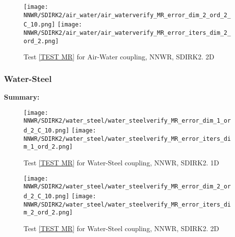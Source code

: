 \documentclass[a4paper,10pt]{article}
\begin{document}
\begin{figure}[!ht]
\texttt{[image: NNWR/SDIRK2/air\_water/air\_waterverify\_MR\_error\_dim\_2\_ord\_2\_C\_10.png]}
\texttt{[image: NNWR/SDIRK2/air\_water/air\_waterverify\_MR\_error\_iters\_dim\_2\_ord\_2.png]}
\caption{Test \ref{TEST MR} for Air-Water coupling, NNWR, SDIRK2. 2D}
\label{FIG NNWR SDIRK2 AIR WATER 2D}
\end{figure}

\FloatBarrier
\subsubsection{Water-Steel}\label{SEC NNWR SDIRK2 WATER STEEL}
% 
\textbf{Summary:}

\begin{figure}[!ht]
\texttt{[image: NNWR/SDIRK2/water\_steel/water\_steelverify\_MR\_error\_dim\_1\_ord\_2\_C\_10.png]}
\texttt{[image: NNWR/SDIRK2/water\_steel/water\_steelverify\_MR\_error\_iters\_dim\_1\_ord\_2.png]}
\caption{Test \ref{TEST MR} for Water-Steel coupling, NNWR, SDIRK2. 1D}
\label{FIG NNWR SDIRK2 WATER STEEL 1D}
\end{figure}

\begin{figure}[!ht]
\texttt{[image: NNWR/SDIRK2/water\_steel/water\_steelverify\_MR\_error\_dim\_2\_ord\_2\_C\_10.png]}
\texttt{[image: NNWR/SDIRK2/water\_steel/water\_steelverify\_MR\_error\_iters\_dim\_2\_ord\_2.png]}
\caption{Test \ref{TEST MR} for Water-Steel coupling, NNWR, SDIRK2. 2D}
\label{FIG NNWR SDIRK2 WATER STEEL 2D}
\end{figure}
\end{document}
